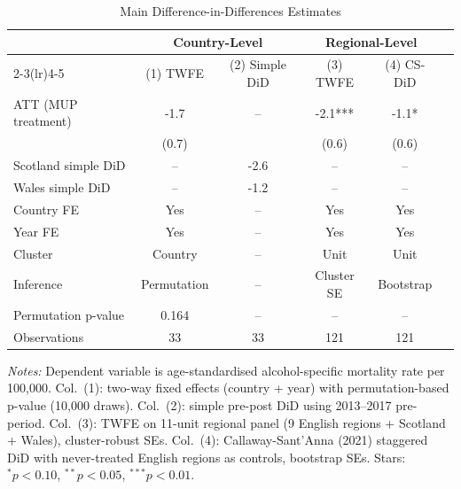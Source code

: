 \begin{table}[htbp]
\centering
\caption{Main Difference-in-Differences Estimates}
\label{tab:main_did}
\small
\begin{tabular}{lccccc}
\toprule
 & \multicolumn{2}{c}{Country-Level} & \multicolumn{2}{c}{Regional-Level} & \\
\cmidrule(lr){2-3}\cmidrule(lr){4-5}
 & (1) TWFE & (2) Simple DiD & (3) TWFE & (4) CS-DiD & \\
\midrule
ATT (MUP treatment) & -1.7 & -- & -2.1*** & -1.1* & \\
 & (0.7) & & (0.6) & (0.6) & \\
\midrule
Scotland simple DiD & -- & -2.6 & -- & -- & \\
Wales simple DiD    & -- & -1.2 & -- & -- & \\
\midrule
Country FE  & Yes & -- & Yes & Yes & \\
Year FE     & Yes & -- & Yes & Yes & \\
Cluster     & Country & -- & Unit & Unit & \\
Inference   & Permutation & -- & Cluster SE & Bootstrap & \\
Permutation p-value & 0.164 & -- & -- & -- & \\
Observations & 33 & 33 & 121 & 121 & \\
\bottomrule
\end{tabular}
\begin{tablenotes}
\small
\item \textit{Notes:} Dependent variable is age-standardised alcohol-specific mortality rate 
per 100,000. Col.~(1): two-way fixed effects (country + year) with permutation-based p-value 
(10,000 draws). Col.~(2): simple pre-post DiD using 2013--2017 pre-period. 
Col.~(3): TWFE on 11-unit regional panel (9 English regions + Scotland + Wales), 
cluster-robust SEs. Col.~(4): Callaway-Sant'Anna (2021) staggered DiD with never-treated 
English regions as controls, bootstrap SEs. Stars: ${}^{*}p<0.10$, ${}^{**}p<0.05$, ${}^{***}p<0.01$.
\end{tablenotes}
\end{table}
